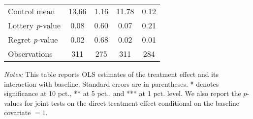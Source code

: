 \begin{table}[htbp]
{\begin{threeparttable}
\begin{tabular}{l*{4}{c}}
Control mean    &    13.66         &     1.16         &    11.78         &     0.12         \\
Lottery \emph{p}-value&     0.08         &     0.60         &     0.07         &     0.21         \\
Regret \emph{p}-value&     0.02         &     0.68         &     0.02         &     0.01         \\
Observations    &      311         &      275         &      311         &      284         \\
\bottomrule \end{tabular} \begin{tablenotes}[flushleft] \footnotesize \item \emph{Notes:} This table reports OLS estimates of the treatment effect and its interaction with baseline. Standard errors are in parentheses. * denotes significance at 10 pct., ** at 5 pct., and *** at 1 pct. level. We also report the \(p\)-values for joint tests on the direct treatment effect conditional on the baseline covariate $= 1$. \end{tablenotes} \end{threeparttable} } \end{table}
